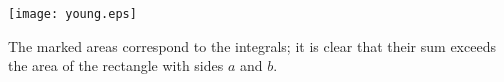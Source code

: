 \documentclass[12pt]{article}
\begin{document}
\begin{center}
\texttt{[image: young.eps]}
\end{center}

The marked areas correspond to the integrals; it is clear that their sum exceeds the area of the rectangle with sides $a$ and $b$.
\end{document}
